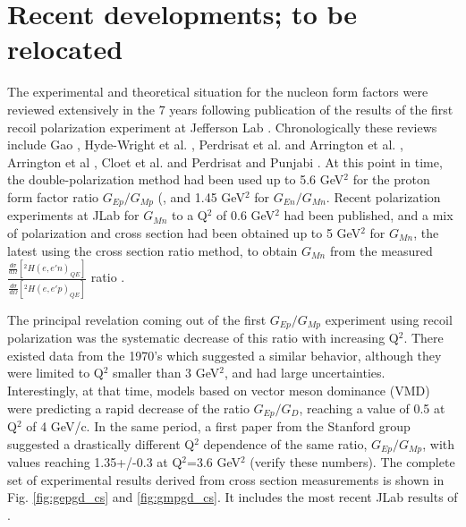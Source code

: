 \section{Recent developments; to be relocated}

The experimental and theoretical situation for the nucleon form factors were reviewed extensively in the 7 years following
publication of the results of the first recoil polarization experiment at Jefferson Lab \cite{jones}. Chronologically
these reviews include Gao \cite{gaoA,gaoB}, Hyde-Wright et al. \cite{charleskees}, Perdrisat et al. \cite{perdrisat:2006} and 
Arrington et al. \cite{arrreview}, Arrington et al \cite{arrington:2011}, Cloet et al. \cite{cloet:2008}
and Perdrisat and Punjabi \cite{scholar}. At this point in time, the double-polarization method had been used up to 5.6 GeV$^2$
for the proton form factor ratio $G_{Ep}/G_{Mp}$ (\cite{jones,punjabi05A,punjabi05B,gayou:2001}, and 1.45 GeV$^2$ for $G_{En}/G_{Mn}$. 
Recent polarization experiments at JLab for $G_{Mn}$ to a Q$^2$ of 0.6 GeV$^2$ \cite{anderson} had been published, and a 
mix of polarization and cross section had been obtained up to 5 GeV$^2$ for $G_{Mn}$, the latest  using the cross section
ratio method, to obtain $G_{Mn}$ from the measured 
${\frac{\frac{d\sigma}{d\Omega}[^2H(e,e'n)_{QE}]}{\frac{d\sigma}{d\Omega}[^2H(e,e'p)_{QE}]}}$ ratio \cite{brooksA,brooksB}.

The principal revelation coming out of the first $G_{Ep}/G_{Mp}$ experiment using recoil polarization was the systematic
decrease of this ratio with increasing Q$^2$. There existed data from the 1970's which suggested a similar behavior, 
although they were limited to Q$^2$ smaller than 3 GeV$^2$, and had large uncertainties. Interestingly, at that time, 
models based on vector meson dominance (VMD) \cite{hohler,gariA,gariB} were predicting a rapid decrease of the ratio
 $G_{Ep}/G_D$, reaching a value of 0.5 at Q$^2$ of 4 GeV/c. In the same period, a first paper from the Stanford group
\cite{litt} suggested a drastically different Q$^2$ dependence of the same ratio, $G_{Ep}/G_{Mp}$, with values reaching
1.35+/-0.3 at Q$^2$=3.6 GeV$^2$ (verify these numbers). The complete set of experimental results derived from cross 
section measurements is shown in Fig. \ref{fig:gepgd_cs} and \ref{fig:gmpgd_cs}. It includes the most recent JLab results
 of \cite{christy,qattan05}.

